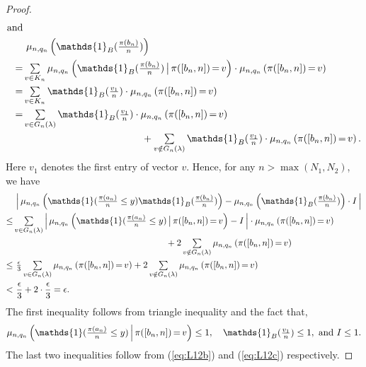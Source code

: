 \begin{proof}
\begin{align*}
  \text{and}&\\
   &\ \textstyle\n\left(\mathds{1}_B(\frac{\pi(b_n)}{n})\right)\\
 {=}& \textstyle\sum\limits_{v \in K_n} \textstyle\n\left(\mathds{1}_B(\frac{\pi(b_n)}{n})\,\big|\, \pi([b_n, n]) \,{=}\, v \right)\cdot \n \left( \pi([b_n, n]) \,{=}\, v \right)\\
 {=}& \textstyle\sum\limits_{v \in K_n} \textstyle\mathds{1}_B(\frac{v_1}{n}) \cdot \n \left( \pi([b_n, n]) \,{=}\, v \right)\\
 {=}&\textstyle\sum\limits_{v \in G_n(\lambda)} \textstyle\mathds{1}_B(\frac{v_1}{n}) \cdot \n \left( \pi([b_n, n]) \,{=}\, v \right)\\
  &\textstyle\qquad\qquad\qquad\qquad\qquad\qquad + \sum\limits_{v \notin G_n(\lambda)} \textstyle\mathds{1}_B(\frac{v_1}{n}) \cdot \n \left( \pi([b_n, n]) \,{=}\, v \right).
\end{align*}
Here $v_1$ denotes the first entry of vector $v$. Hence, for any $n > \max{(N_1, N_2)}$, we have
\begin{align*}
  &\,\textstyle\left|\,\n\left( \mathds{1}(\frac{\pi(a_n)}{n} \le y)\mathds{1}_B(\frac{\pi(b_n)}{n})\right)
    - \n\left(\mathds{1}_B(\frac{\pi(b_n)}{n})\right)\cdot I \, \right|\\
  \le& \textstyle\sum\limits_{v \in G_n(\lambda)}\textstyle\left|\, \n\left( \mathds{1}(\frac{\pi(a_n)}{n} \le y) \, \big|\,  \pi([b_n, n]) \,{=}\, v \right) - I \, \right|
     \cdot \n \left( \pi([b_n, n]) \,{=}\, v \right)\\
     &\qquad\qquad\qquad\qquad\qquad\qquad\qquad\qquad\quad\textstyle +  2\sum\limits_{v \notin G_n(\lambda)} \n \left( \pi([b_n, n])\,{=}\, v \right)\\
  \le&\  \textstyle\frac{\epsilon}{3} \sum\limits_{v \in G_n(\lambda)} \n \left( \pi([b_n, n]) \,{=}\, v \right)
     + 2\sum\limits_{v \notin G_n(\lambda)} \n \left( \pi([b_n, n]) \,{=}\, v \right)\\
  <&\  \frac{\epsilon}{3} + 2\cdot \frac{\epsilon}{3} = \epsilon.
\end{align*}
The first inequality follows from triangle inequality and the fact that,
\[
\textstyle\n\left( \mathds{1}(\frac{\pi(a_n)}{n} \le y) \,\Big|\, \pi([b_n, n]) \,{=}\, v \right) \le 1, \quad \mathds{1}_B(\frac{v_1}{n}) \le 1,
\text{ and } I \le 1.
\]
The last two inequalities follow from (\ref{eq:L12b}) and (\ref{eq:L12c}) respectively.


\end{proof}




